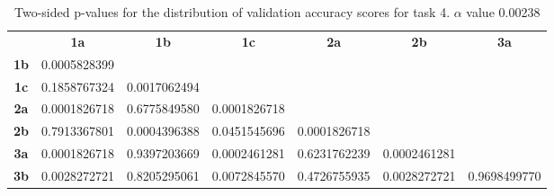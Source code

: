 \begin{table}[h!]
    \centering
    \begin{tabular}{ccccccc}
                & \textbf{1a}        & \textbf{1b}        & \textbf{1c}        & \textbf{2a}        & \textbf{2b}        & \textbf{3a}  \\
    \textbf{1b} & 0.0005828399       &                    &                    &                    &                    &              \\
    \textbf{1c} & 0.1858767324       & 0.0017062494       &                    &                    &                    &              \\
    \textbf{2a} & 0.0001826718       & 0.6775849580       & 0.0001826718       &                    &                    &              \\
    \textbf{2b} & 0.7913367801       & 0.0004396388       & 0.0451545696       & 0.0001826718       &                    &              \\
    \textbf{3a} & 0.0001826718       & 0.9397203669       & 0.0002461281       & 0.6231762239       & 0.0002461281       &              \\
    \textbf{3b} & 0.0028272721       & 0.8205295061       & 0.0072845570       & 0.4726755935       & 0.0028272721       & 0.9698499770
    \end{tabular}
    \caption{Two-sided p-values for the distribution of validation accuracy scores for task 4. \(\alpha\) value 0.00238}
    \label{tab:exp2.validation4}
\end{table}

\newpage